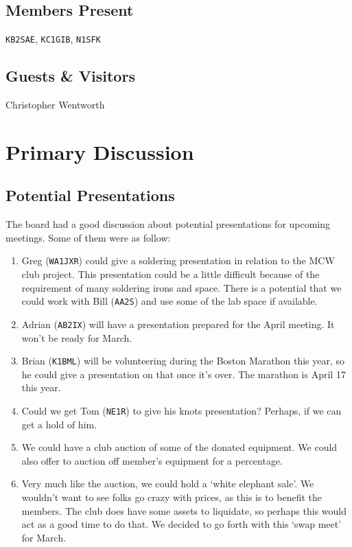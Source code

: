 \documentclass[10pt,letterpaper]{article}
\begin{document}
\subsection{Members Present}
\texttt{KB2SAE},
\texttt{KC1GIB},
\texttt{N1SFK}

\subsection{Guests \& Visitors}
Christopher Wentworth

\section{Primary Discussion}

\subsection{Potential Presentations}
The board had a good discussion about potential presentations for upcoming meetings. Some of them were as follow:
\begin{enumerate}
  \item Greg (\texttt{WA1JXR}) could give a soldering presentation in relation to the MCW club project. This presentation could be a little difficult because of the requirement of many soldering irons and space. There is a potential that we could work with Bill (\texttt{AA2S}) and use some of the lab space if available.
  \item Adrian (\texttt{AB2IX}) will have a presentation prepared for the April meeting. It won't be ready for March.
  \item Brian (\texttt{K1BML}) will be volunteering during the Boston Marathon this year, so he could give a presentation on that once it's over. The marathon is April 17 this year.
  \item Could we get Tom (\texttt{NE1R}) to give his knots presentation? Perhaps, if we can get a hold of him.
  \item We could have a club auction of some of the donated equipment. We could also offer to auction off member's equipment for a percentage.
  \item Very much like the auction, we could hold a `white elephant sale'. We wouldn't want to see folks go crazy with prices, as this is to benefit the members. The club does have some assets to liquidate, so perhaps this would act as a good time to do that. We decided to go forth with this `swap meet' for March.
\end{enumerate}
\end{document}
